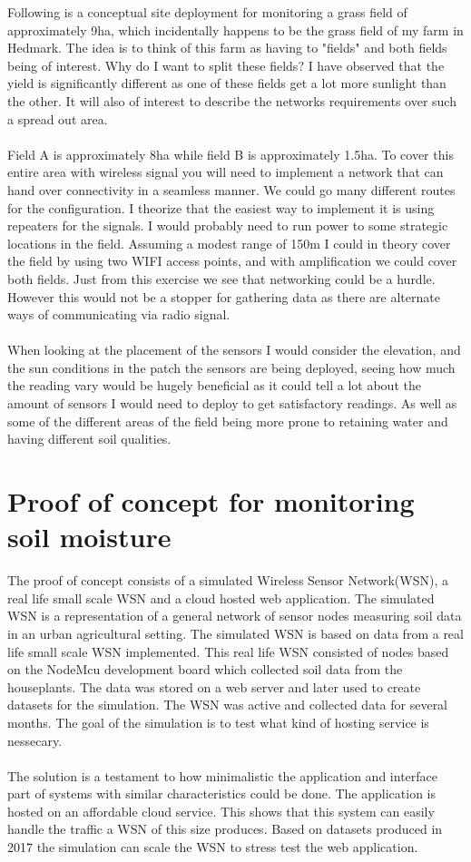\documentclass[]{uiophd}
\begin{document}
 Following is a conceptual site deployment for monitoring a grass field of approximately 9ha, which incidentally happens to be the grass field of my farm in Hedmark. The idea is to think of this farm as having to "fields" and both fields being of interest. Why do I want to split these fields? I have observed that the yield is significantly different as one of these fields get a lot more sunlight than the other. It will also of interest to describe the networks requirements over such a spread out area.
 \\\\
 Field A is approximately 8ha while field B is approximately 1.5ha. To cover this entire area with wireless signal you will need to implement a network that can hand over connectivity in a seamless manner. We could go many different routes for the configuration. I theorize that the easiest way to implement it is using repeaters for the signals. I would probably need to run power to some strategic locations in the field. Assuming a modest range of 150m I could in theory cover the field by using two WIFI access points, and with amplification we could cover both fields. Just from this exercise we see that networking could be a hurdle. However this would not be a stopper for gathering data as there are alternate ways of communicating via radio signal.
 \\\\
 When looking at the placement of the sensors I would consider the elevation, and the sun conditions in the patch the sensors are being deployed, seeing how much the reading vary would be hugely beneficial as it could tell a lot about the amount of sensors I would need to deploy to get satisfactory readings. As well as some of the different areas of the field being more prone to retaining water and having different soil qualities. 
 
\chapter{Proof of concept for monitoring soil moisture}
The proof of concept consists of a simulated Wireless Sensor Network(WSN), a real life small scale WSN and a cloud hosted web application. The simulated WSN is a representation of a general network of sensor nodes measuring soil data in an urban agricultural setting. The simulated WSN is based on data from a real life small scale WSN implemented. This real life WSN consisted of nodes based on the NodeMcu development board which collected soil data from the houseplants. The data was stored on a web server and later used to create datasets for the simulation. The WSN was active and collected data for several months. The goal of the simulation is to test what kind of hosting service is nessecary.
\\\\
The solution is a testament to how minimalistic the application and interface part of systems with similar characteristics could be done. The application is hosted on an affordable cloud service. This shows that this system can easily handle the traffic a WSN of this size produces. Based on datasets produced in 2017 the simulation can scale the WSN to stress test the web application.
\end{document}

